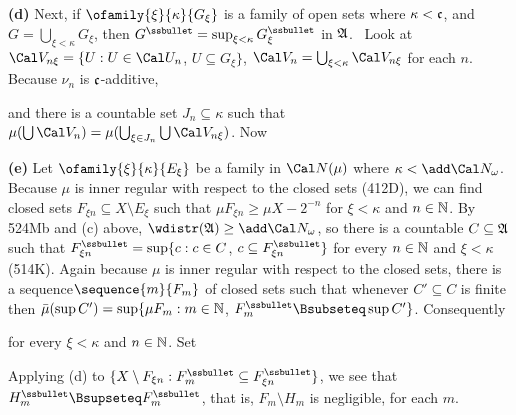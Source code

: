{{\bf (d)} Next, if $\ofamily{\xi}{\kappa}{G_{\xi}}$ is a family of
open sets where $\kappa<\frak c$, and $G=\bigcup_{\xi<\kappa}G_{\xi}$,
then $G^{\ssbullet}=\sup_{\xi<\kappa}G_{\xi}^{\ssbullet}$ in $\frak A$.
\Prf\ Look at
$\Cal V_{n\xi}=\{U:U\in\Cal U_n$, $U\subseteq G_{\xi}\}$,
$\Cal V_n=\bigcup_{\xi<\kappa}\Cal V_{n\xi}$ for each $n$.
Because $\nu_n$ is $\frak c$-additive,


\noindent and there is a countable set $J_n\subseteq\kappa$ such that
$\mu(\bigcup\Cal V_n)=\mu(\bigcup_{\xi\in J_n}\bigcup\Cal V_{n\xi})$.
Now


\medskip

{\bf (e)} Let $\ofamily{\xi}{\kappa}{E_{\xi}}$ be a
family in $\Cal N(\mu)$ where $\kappa<\add\Cal N_{\omega}$.
Because $\mu$ is inner regular with respect to the closed sets (412D),
we can find closed sets $F_{\xi n}\subseteq X\setminus E_{\xi}$
such that $\mu F_{\xi n}\ge\mu X-2^{-n}$ for $\xi<\kappa$ and $n\in\Bbb N$.
By 524Mb and (c) above, $\wdistr(\frak A)\ge\add\Cal N_{\omega}$,
so there is a countable $C\subseteq\frak A$ such that
$F_{\xi n}^{\ssbullet}
=\sup\{c:c\in C$, $c\subseteq F_{\xi n}^{\ssbullet}\}$
for every $n\in\Bbb N$ and
$\xi<\kappa$ (514K).   Again because $\mu$ is inner
regular with respect to the closed sets, there is a
sequence$\sequence{m}{F_m}$ of closed sets such that whenever
$C'\subseteq C$ is finite then $\bar\mu(\sup C')
=\sup\{\mu F_m:m\in\Bbb N$, $F_m^{\ssbullet}\Bsubseteq\sup C'\}$.
Consequently


\noindent for every $\xi<\kappa$ and $n\in\Bbb N$.   Set


\noindent Applying (d) to
$\{X\setminus F_{\xi n}:F_m^{\ssbullet}\subseteq F_{\xi n}^{\ssbullet}\}$,
we see that $H_m^{\ssbullet}\Bsupseteq F_m^{\ssbullet}$, that is,
$F_m\setminus H_m$ is negligible, for each $m$.

}
